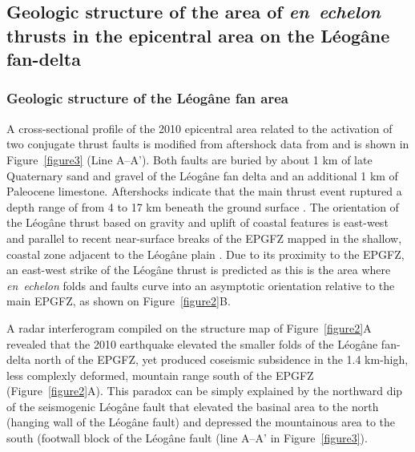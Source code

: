 \documentclass[linenumbers,draft]{agujournal}
\begin{document}
\subsection{Geologic structure of the area of \textit{en~echelon} thrusts in the epicentral area on the L\'eog\^ane fan-delta}
\subsubsection{Geologic structure of the L\'eog\^ane fan area}
A cross-sectional profile of the 2010 epicentral area related to the activation of two conjugate thrust faults is modified from aftershock data from \citet{douilly2013crustal,douilly2015three} and is shown in Figure~\ref{figure3} (Line A--A'). Both faults are buried by about 1 km of late Quaternary sand and gravel of the L\'eog\^ane fan delta \citep{kocel2016near} and an additional 1 km of Paleocene limestone. Aftershocks indicate that the main thrust event ruptured a depth range of from 4 to 17 km beneath the ground surface \citep{douilly2013crustal,douilly2015three}. The orientation of the L\'eog\^ane thrust based on gravity and uplift of coastal features is east-west and parallel to recent near-surface breaks of the EPGFZ mapped in the shallow, coastal zone adjacent to the L\'eog\^ane plain \citep{hornbach2010high}. Due to its proximity to the EPGFZ, an east-west strike of the L\'eog\^ane thrust is predicted as this is the area where \textit{en~echelon} folds and faults curve into an asymptotic orientation relative to the main EPGFZ, as shown on Figure~\ref{figure2}B.

A radar interferogram compiled on the structure map of Figure~\ref{figure2}A revealed that the 2010 earthquake elevated the smaller folds of the L\'eog\^ane fan-delta north of the EPGFZ, yet produced coseismic subsidence in the 1.4 km-high, less complexly deformed, mountain range south of the EPGFZ \citep{hashimoto2011fan} (Figure~\ref{figure2}A). This paradox can be simply explained by the northward dip of the seismogenic L\'eog\^ane fault that elevated the basinal area to the north (hanging wall of the L\'eog\^ane fault) and depressed the mountainous area to the south (footwall block of the L\'eog\^ane fault (line A--A' in Figure~\ref{figure3}). 
\end{document}

